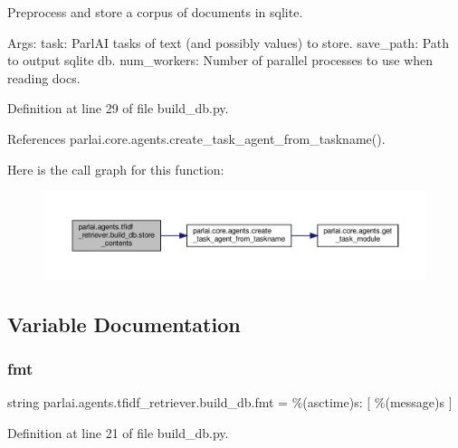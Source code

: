 \begin{DoxyVerb}Preprocess and store a corpus of documents in sqlite.

Args:
    task: ParlAI tasks of text (and possibly values) to store.
    save_path: Path to output sqlite db.
    num_workers: Number of parallel processes to use when reading docs.
\end{DoxyVerb}
 

Definition at line 29 of file build\+\_\+db.\+py.



References parlai.\+core.\+agents.\+create\+\_\+task\+\_\+agent\+\_\+from\+\_\+taskname().

Here is the call graph for this function\+:
\nopagebreak
\begin{figure}[H]
\begin{center}
\leavevmode
\includegraphics[width=350pt]{namespaceparlai_1_1agents_1_1tfidf__retriever_1_1build__db_a794fe63c76c7ac42ca1ac1b18c2528f4_cgraph}
\end{center}
\end{figure}


\subsection{Variable Documentation}
\mbox{\label{namespaceparlai_1_1agents_1_1tfidf__retriever_1_1build__db_a7a8b2cb13da2ca64f153da8af410072e}} 
\subsubsection{\texorpdfstring{fmt}{fmt}}
{\footnotesize\ttfamily string parlai.\+agents.\+tfidf\+\_\+retriever.\+build\+\_\+db.\+fmt = \textquotesingle{}\%(asctime)s\+: \mbox{[} \%(message)s \mbox{]}\textquotesingle{}}



Definition at line 21 of file build\+\_\+db.\+py.

